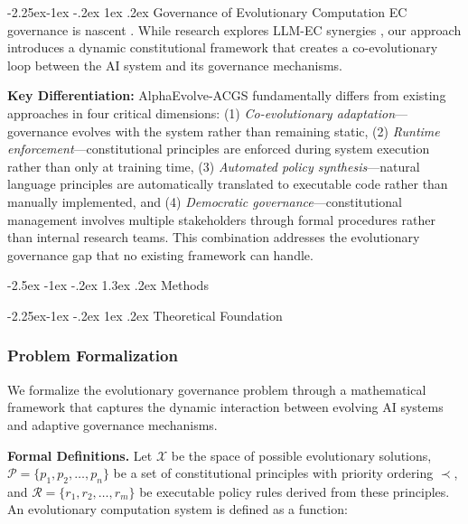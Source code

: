\documentclass[manuscript,screen,review,anonymous,9pt]{acmart}
\makeatletter
\renewcommand\section{\@startsection{section}{1}{\z@}%
  {-2.5ex \@plus -1ex \@minus -.2ex}%
  {1.3ex \@plus.2ex}%
  {\normalfont\Large\bfseries}}
\renewcommand\subsection{\@startsection{subsection}{2}{\z@}%
  {-2.25ex\@plus -1ex \@minus -.2ex}%
  {1ex \@plus .2ex}%
  {\normalfont\large\bfseries}}
\makeatother
\begin{document}
\subsection{Governance of Evolutionary Computation}
EC governance is nascent \cite{Chauhan2025ECLLMSurvey}. While research explores LLM-EC synergies \cite{Nordin2024LLMGP}, our approach introduces a dynamic constitutional framework that creates a co-evolutionary loop between the AI system and its governance mechanisms.

\textbf{Key Differentiation:} AlphaEvolve-ACGS fundamentally differs from existing approaches in four critical dimensions: (1) \textit{Co-evolutionary adaptation}---governance evolves with the system rather than remaining static, (2) \textit{Runtime enforcement}---constitutional principles are enforced during system execution rather than only at training time, (3) \textit{Automated policy synthesis}---natural language principles are automatically translated to executable code rather than manually implemented, and (4) \textit{Democratic governance}---constitutional management involves multiple stakeholders through formal procedures rather than internal research teams. This combination addresses the evolutionary governance gap that no existing framework can handle.

\section{Methods}
\label{sec:methods}

\subsection{Theoretical Foundation}
\label{subsec:theoretical_foundation}

\subsubsection{Problem Formalization}
\label{subsubsec:problem_formalization}

We formalize the evolutionary governance problem through a mathematical framework that captures the dynamic interaction between evolving AI systems and adaptive governance mechanisms.

\textbf{Formal Definitions.} Let $\mathcal{X}$ be the space of possible evolutionary solutions, $\mathcal{P} = \{p_1, p_2, \ldots, p_n\}$ be a set of constitutional principles with priority ordering $\prec$, and $\mathcal{R} = \{r_1, r_2, \ldots, r_m\}$ be executable policy rules derived from these principles. An evolutionary computation system is defined as a function:
\end{document}
